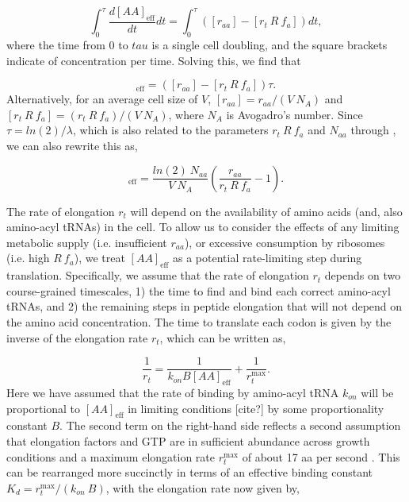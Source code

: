\begin{equation}
\int_{0}^{\tau} \frac{d[AA]_{\text{eff}}}{dt} dt =  \int_{0}^{\tau} ([r_{aa}] - [r_t \ R \ f_a]) dt,
\end{equation}
where the time from 0 to $tau$ is a single cell doubling, and the square brackets indicate of concentration per time. Solving this, we find that

\begin{equation}
[AA]_{\text{eff}} =  ([r_{aa}] - [r_t \ R \ f_a]) \tau.
\end{equation}
Alternatively, for an average cell size of $V$,  $[r_{aa}] = r_{aa}/(V \ N_A)$
and $[r_t \ R \ f_a] = (r_t \ R \ f_a)/(V \ N_A)$, where $N_A$ is Avogadro's
number. Since $\tau = ln(2)/\lambda$, which is also related to the parameters
$r_t \ R \ f_a$ and $N_{aa}$ through , we
can also rewrite this as,

\begin{equation}
[AA]_{\text{eff}} = \frac{ln(2) \ N_{aa}}{V \ N_A} \left(\frac{r_{aa}}{r_t \ R \ f_a} - 1 \right) .
\label{eq:aa_final}
\end{equation}

The rate of elongation $r_t$ will depend on the availability of amino acids
(and, also amino-acyl tRNAs) in the cell. To allow us to consider the effects of
any limiting metabolic supply (i.e. insufficient $r_{aa}$), or excessive
consumption by ribosomes (i.e. high $R \ f_a$), we treat $[AA]_{\text{eff}}$ as
a potential rate-limiting step during translation. Specifically, we assume that
the rate of elongation $r_t$ depends on two course-grained timescales, 1) the
time to find and bind each correct amino-acyl tRNAs, and 2) the remaining steps
in peptide elongation that will not depend on the amino acid concentration. The
time to translate each codon is given by the inverse of the elongation rate
$r_t$, which can be written as,

\begin{equation}
\frac{1}{r_t} = \frac{1}{k_{on} B [AA]_{\text{eff}}} + \frac{1}{r_{t}^{\text{max}}}.
\end{equation}
Here we have assumed that the rate of binding by amino-acyl tRNA $k_{on}$ will
be proportional to $[AA]_{\text{eff}}$ in limiting conditions [cite?] by some
proportionality constant $B$. The second term on the right-hand side reflects a second
assumption that elongation factors and GTP are in sufficient abundance across
growth conditions and a maximum elongation rate $r_{t}^{\text{max}}$
of about 17 aa per second \cite{dai2016}. This can be rearranged more succinctly in
terms of an effective binding constant $K_d = r_{t}^{\text{max}}/ (k_{on} \ B)$, with
the elongation rate now given by,

